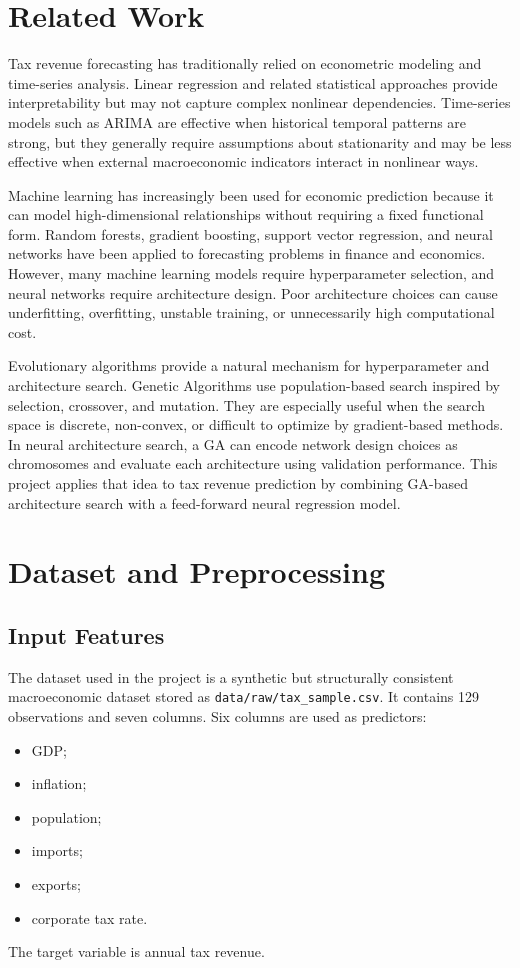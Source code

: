 \documentclass[conference]{IEEEtran}
\begin{document}
\section{Related Work}
Tax revenue forecasting has traditionally relied on econometric modeling and time-series analysis. Linear regression and related statistical approaches provide interpretability but may not capture complex nonlinear dependencies. Time-series models such as ARIMA are effective when historical temporal patterns are strong, but they generally require assumptions about stationarity and may be less effective when external macroeconomic indicators interact in nonlinear ways.

Machine learning has increasingly been used for economic prediction because it can model high-dimensional relationships without requiring a fixed functional form. Random forests, gradient boosting, support vector regression, and neural networks have been applied to forecasting problems in finance and economics. However, many machine learning models require hyperparameter selection, and neural networks require architecture design. Poor architecture choices can cause underfitting, overfitting, unstable training, or unnecessarily high computational cost.

Evolutionary algorithms provide a natural mechanism for hyperparameter and architecture search. Genetic Algorithms use population-based search inspired by selection, crossover, and mutation. They are especially useful when the search space is discrete, non-convex, or difficult to optimize by gradient-based methods. In neural architecture search, a GA can encode network design choices as chromosomes and evaluate each architecture using validation performance. This project applies that idea to tax revenue prediction by combining GA-based architecture search with a feed-forward neural regression model.

\section{Dataset and Preprocessing}
\subsection{Input Features}
The dataset used in the project is a synthetic but structurally consistent macroeconomic dataset stored as \texttt{data/raw/tax\_sample.csv}. It contains 129 observations and seven columns. Six columns are used as predictors:
\begin{itemize}
    \item GDP;
    \item inflation;
    \item population;
    \item imports;
    \item exports;
    \item corporate tax rate.
\end{itemize}
The target variable is annual tax revenue.
\end{document}
